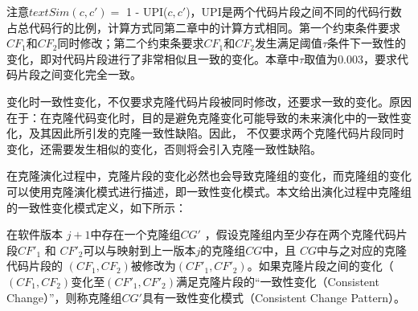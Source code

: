   
注意$\mathit {textSim}(c,c')= $ 1 - UPI($ c,c'$)，UPI是两个代码片段之间不同的代码行数占总代码行的比例，计算方式同第二章中的计算方式相同。第一个约束条件要求 $ CF_1 $和$CF_2 $同时修改；第二个约束条要求$ CF_1 $和$CF_2$发生满足阈值$\tau$条件下一致性的变化，即对代码片段进行了非常相似且一致的变化。本章中$\tau$取值为$0.003$，要求代码片段之间变化完全一致。

变化时一致性变化，不仅要求克隆代码片段被同时修改，还要求一致的变化。原因在于：在克隆代码变化时，目的是避免克隆变化可能导致的未来演化中的一致性变化，及其因此所引发的克隆一致性缺陷。因此， 不仅要求两个克隆代码片段同时变化，还需要发生相似的变化，否则将会引入克隆一致性缺陷。

在克隆演化过程中，克隆片段的变化必然也会导致克隆组的变化，而克隆组的变化可以使用克隆演化模式进行描述，即一致性变化模式。本文给出演化过程中克隆组的一致性变化模式定义，如下所示：\\

\begin{definition}
\label{def-changingpattern}
在软件版本 $j+1$中存在一个克隆组$CG'$ ，假设克隆组内至少存在两个克隆代码片段$CF'_1$ 和 $CF'_2$可以与映射到上一版本$j$的克隆组$CG$中，且 $CG$中与之对应的克隆代码片段的 $(CF_1,CF_2)$被修改为$(CF'_1,CF'_2)$。如果克隆片段之间的变化（ $(CF_1,CF_2)$变化至$(CF'_1,CF'_2)$满足克隆片段的“一致性变化（Consistent Change）”，则称克隆组$CG'$具有一致性变化模式（Consistent Change Pattern）。
\end{definition}


